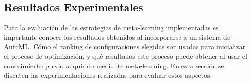 %	
%	
%
%
%
%

\subsection{Resultados Experimentales}\label{subsec:resultados}

%
%


Para la evaluación de las estrategias de meta-learning implementadas es importante conocer los resultados obtenidos al incorporarse a un sistema de AutoML. Cómo el ranking de configuraciones elegidas son usadas para inicializar el proceso de optimización, y qué resultados este proceso puede obtener al usar el conocimiento previo adquirido mediante meta-learning. En esta sección se discuten las experimentaciones realizadas para evaluar estos aspectos.

